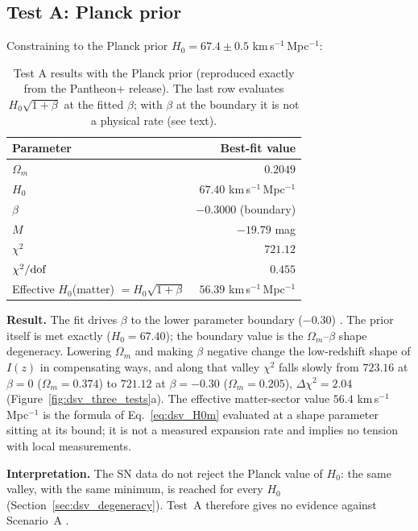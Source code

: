\subsection{Test A: Planck prior}
Constraining to the Planck prior $H_0=67.4\pm0.5$ km\,s$^{-1}$\,Mpc$^{-1}$:
\begin{table}[htbp]\centering\small
\caption[Test A: Planck prior]{Test A results with the Planck prior (reproduced exactly from the Pantheon+ release). The last row evaluates
$H_0\sqrt{1+\beta}$ at the fitted $\beta$; with $\beta$ at the boundary it is not a physical rate (see text). \calc}\label{tab:dsv_testA}
\begin{tabular}{lr}\toprule
Parameter & Best-fit value\\\midrule
$\Omega_m$ & $0.2049$\\
$H_0$ & $67.40$ km\,s$^{-1}$\,Mpc$^{-1}$\\
$\beta$ & $-0.3000$ (boundary)\\
$M$ & $-19.79$ mag\\
$\chi^2$ & $721.12$\\
$\chi^2/{\rm dof}$ & $0.455$\\
Effective $H_0$(matter) $=H_0\sqrt{1+\beta}$ & $56.39$ km\,s$^{-1}$\,Mpc$^{-1}$\\\bottomrule
\end{tabular}
\end{table}
\textbf{Result.} The fit drives $\beta$ to the lower parameter boundary ($-0.30$) \calc. The prior itself is met exactly ($H_0=67.40$); the boundary value
is the $\Omega_m$--$\beta$ shape degeneracy. Lowering $\Omega_m$ and making $\beta$ negative change the low-redshift shape of $I(z)$ in compensating
ways, and along that valley $\chi^2$ falls slowly from $723.16$ at $\beta=0$ ($\Omega_m=0.374$) to $721.12$ at $\beta=-0.30$ ($\Omega_m=0.205$),
$\Delta\chi^2=2.04$ (Figure~\ref{fig:dsv_three_tests}a). The effective matter-sector value $56.4$ km\,s$^{-1}$\,Mpc$^{-1}$ is the formula of
Eq.~\eqref{eq:dsv_H0m} evaluated at a shape parameter sitting at its bound; it is not a measured expansion rate and implies no tension with local
measurements.

\textbf{Interpretation.} The SN data do not reject the Planck value of $H_0$: the same valley, with the same minimum, is reached for every $H_0$
(Section~\ref{sec:dsv_degeneracy}). Test~A therefore gives no evidence against Scenario~A \derived.

